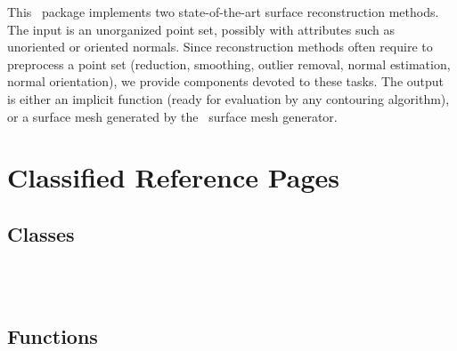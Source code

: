 


This \cgal\ package implements two state-of-the-art surface reconstruction methods.
The input is an unorganized point set, possibly with attributes such as unoriented or oriented normals.
Since reconstruction methods often require to preprocess a point set (reduction, smoothing,
outlier removal, normal estimation, normal orientation), we provide components devoted to these tasks.
The output is either an implicit function (ready for evaluation by any contouring algorithm),
or a surface mesh generated by the \cgal\ surface mesh generator.

\section{Classified Reference Pages}


\subsection{Classes}

  \\
  \\


\subsection{Functions}

  \\
  \\
  \\
  \\

